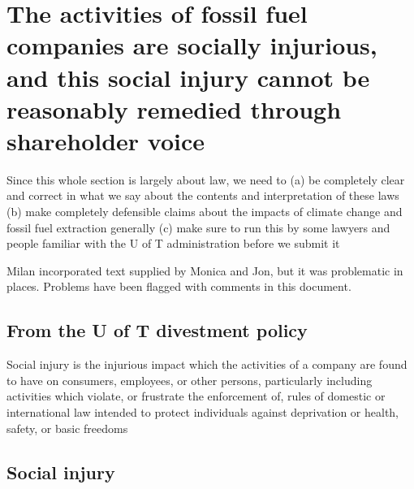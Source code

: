 
		\section{The activities of fossil fuel companies are socially injurious, and this social injury cannot be reasonably remedied through shareholder voice}

\begin{vcom}		
Since this whole section is largely about law, we need to (a) be completely clear and correct in what we say about the contents and interpretation of these laws (b) make completely defensible claims about the impacts of climate change and fossil fuel extraction generally (c) make sure to run this by some lawyers and people familiar with the U of T administration before we submit it
\end{vcom}

\begin{vcom}
Milan incorporated text supplied by Monica and Jon, but it was problematic in places. Problems have been flagged with comments in this document.
\end{vcom}

	\subsection{From the U of T divestment policy}

\begin{itquote}
Social injury is the injurious impact which the activities of a company are found to have on consumers, employees, or other persons, particularly including activities which violate, or frustrate the enforcement of, rules of domestic or international law intended to protect individuals against deprivation or health, safety, or basic freedoms
\end{itquote}



	\subsection{Social injury}


